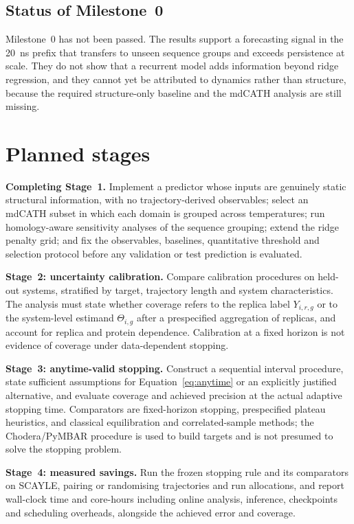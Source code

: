 \documentclass[11pt]{article}
\begin{document}
\subsection{Status of Milestone~0}

Milestone~0 has not been passed. The results support a forecasting signal in the 20~ns prefix that transfers to unseen sequence groups and exceeds persistence at scale. They do not show that a recurrent model adds information beyond ridge regression, and they cannot yet be attributed to dynamics rather than structure, because the required structure-only baseline and the mdCATH analysis are still missing.

\section{Planned stages}

\textbf{Completing Stage~1.} Implement a predictor whose inputs are genuinely static structural information, with no trajectory-derived observables; select an mdCATH subset in which each domain is grouped across temperatures; run homology-aware sensitivity analyses of the sequence grouping; extend the ridge penalty grid; and fix the observables, baselines, quantitative threshold and selection protocol before any validation or test prediction is evaluated.

\textbf{Stage~2: uncertainty calibration.} Compare calibration procedures on held-out systems, stratified by target, trajectory length and system characteristics. The analysis must state whether coverage refers to the replica label $Y_{i,r,g}$ or to the system-level estimand $\Theta_{i,g}$ after a prespecified aggregation of replicas, and account for replica and protein dependence. Calibration at a fixed horizon is not evidence of coverage under data-dependent stopping.

\textbf{Stage~3: anytime-valid stopping.} Construct a sequential interval procedure, state sufficient assumptions for Equation~\eqref{eq:anytime} or an explicitly justified alternative, and evaluate coverage and achieved precision at the actual adaptive stopping time. Comparators are fixed-horizon stopping, prespecified plateau heuristics, and classical equilibration and correlated-sample methods; the Chodera/PyMBAR procedure is used to build targets and is not presumed to solve the stopping problem.

\textbf{Stage~4: measured savings.} Run the frozen stopping rule and its comparators on SCAYLE, pairing or randomising trajectories and run allocations, and report wall-clock time and core-hours including online analysis, inference, checkpoints and scheduling overheads, alongside the achieved error and coverage.
\end{document}
